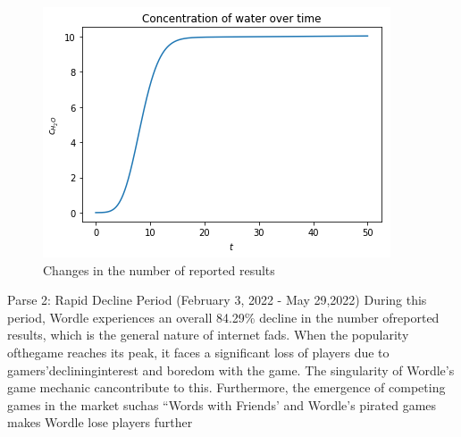 \documentclass[12pt]{ctexart}
\begin{document}
\begin{figure}[htbp]
	\centering
	\includegraphics[height=9\baselineskip]{water.png}
	\caption{Changes in the number of reported results}
\end{figure}

\raisebox{-0.8ex}{\scalebox{2.2}{\textbullet}}\hspace{0.5em} Parse 2: Rapid Decline Period (February 3, 2022 - May 29,2022)
During this period, Wordle experiences an overall 84.29\% decline in the number ofreported results, which is the general nature of internet fads. When the popularity ofthegame reaches its peak, it faces a significant loss of players due to gamers’declininginterest and boredom with the game. The singularity of Wordle's game mechanic cancontribute to this. Furthermore, the emergence of competing games in the market suchas “Words with Friends’ and Wordle's pirated games makes Wordle lose players further


\end{document}
